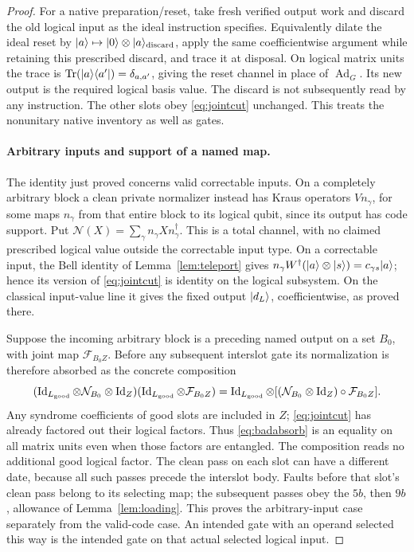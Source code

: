 \begin{proof}
For a native preparation/reset, take fresh verified output work and discard the old logical input as the ideal instruction specifies. Equivalently dilate the ideal reset by $\lvert a\rangle\mapsto\lvert 0\rangle\otimes\lvert a\rangle_{\rm discard}$, apply the same coefficientwise argument while retaining this prescribed discard, and trace it at disposal. On logical matrix units the trace is $\operatorname{Tr}(|a\rangle\langle a'|)=\delta_{a,a'}$, giving the reset channel in place of $\operatorname{Ad}_G$. Its new output is the required logical basis value. The discard is not subsequently read by any instruction. The other slots obey \eqref{eq:jointcut} unchanged. This treats the nonunitary native inventory as well as gates.

\paragraph{Arbitrary inputs and support of a named map.}
The identity just proved concerns valid correctable inputs. On a completely arbitrary block a clean private normalizer instead has Kraus operators $Vn_\gamma$, for some maps $n_\gamma$ from that entire block to its logical qubit, since its output has code support. Put $\mathcal N(X)=\sum_\gamma n_\gamma Xn_\gamma^\dagger$. This is a total channel, with no claimed prescribed logical value outside the correctable input type. On a correctable input, the Bell identity of Lemma~\ref{lem:teleport} gives $n_\gamma W^\dagger(\lvert a\rangle\otimes\lvert s\rangle)=c_{\gamma s}\lvert a\rangle$; hence its version of \eqref{eq:jointcut} is identity on the logical subsystem. On the classical input-value line it gives the fixed output $\lvert d_L\rangle$, coefficientwise, as proved there.

Suppose the incoming arbitrary block is a preceding named output on a set $B_0$, with joint map $\mathcal F_{B_0Z}$. Before any subsequent interslot gate its normalization is therefore absorbed as the concrete composition
\begin{equation}\label{eq:badabsorb}
 (\operatorname{Id}_{L_{\rm good}}\otimes\mathcal N_{B_0}\otimes\operatorname{Id}_Z)
 (\operatorname{Id}_{L_{\rm good}}\otimes\mathcal F_{B_0Z})
 =
 \operatorname{Id}_{L_{\rm good}}\otimes
 [(\mathcal N_{B_0}\otimes\operatorname{Id}_Z)\circ\mathcal F_{B_0Z}].
\end{equation}
Any syndrome coefficients of good slots are included in $Z$; \eqref{eq:jointcut} has already factored out their logical factors. Thus \eqref{eq:badabsorb} is an equality on all matrix units even when those factors are entangled. The composition reads no additional good logical factor. The clean pass on each slot can have a different date, because all such passes precede the interslot body. Faults before that slot's clean pass belong to its selecting map; the subsequent passes obey the $5b$, then $9b$, allowance of Lemma~\ref{lem:loading}. This proves the arbitrary-input case separately from the valid-code case. An intended gate with an operand selected this way is the intended gate on that actual selected logical input.


\end{proof}
